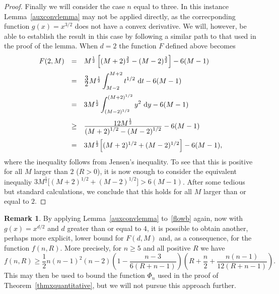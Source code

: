 \documentclass[11pt,a4paper,times]{amsart}
\theoremstyle{plain}
\theoremstyle{definition}
\newtheorem{remark}{Remark}[section]
\numberwithin{equation}{section}
\newcommand{\ds}{\displaystyle}
\newcommand{\dint}{\ds\int}
\newcommand{\eqskip}{ \vspace*{2mm}\\ }
\newcommand{\fr}[2]{\frac{\ds #1}{\ds #2}}
\begin{document}
{\begin{proof}
 Finally we will consider the case $n$ equal to three. In this instance Lemma~\ref{auxconvlemma} may not be applied directly,
 as the correcponding function $g(x) = x^{3/2}$ does not have a convex derivative. We will, however, be able to establish the
 result in this case by following a similar path to that used in the proof of the lemma. When $d=2$ the function $F$ defined above
 becomes
 \[
 \begin{array}{lll}
  F(2,M) & = & M^{\frac{1}{2}}\left[ (M+2)^{\frac{3}{2}} - (M-2)^{\frac{3}{2}} \right] -6(M-1)\eqskip
  & = & \fr{3}{2} M^{\frac{1}{2}} \dint_{M-2}^{M+2} t^{1/2} \ {\rm d}t - 6(M-1)\eqskip
  & = & 3M^{\frac{1}{2}} \dint_{(M-2)^{1/2}}^{(M+2)^{1/2}} y^2 \ {\rm d}y - 6(M-1) \eqskip
  & \geq & \fr{12 M^{\frac{1}{2}}}{(M+2)^{1/2}-(M-2)^{1/2}}- 6(M-1)\eqskip
  & = & 3M^{\frac{1}{2}} \Big[(M+2)^{1/2}+(M-2)^{1/2}\Big]- 6(M-1),
 \end{array}
 \]
 where the inequality follows from Jensen's inequality. To see that this is positive for all $M$ larger than $2$ ($R>0$),
 it is now enough to consider the equivalent inequaliy $3M^{\frac{1}{2}} \Big[(M+2)^{1/2}+(M-2)^{1/2}\Big] > 6(M-1)$.
 After some tedious but standard calculations, we conclude that this holds for all $M$ larger than or equal to $2$.
\end{proof}
\begin{remark}
 By applying Lemma~\ref{auxconvlemma} to~\eqref{flowb} again, now with $g(x) = x^{d/2}$ and $d$ greater than or equal to $4$,
 it is possible to obtain another, perhaps more explicit, lower bound for $F(d,M)$ and, as a consequence, for the function $f(n,R)$.
 More precisely, for $n\geq5$ and all positive $R$ we have
 \[
  f(n,R) \geq \fr{1}{2}n(n-1)^2(n-2) \left(1-\fr{n-3}{6(R+n-1)} \right) \left( R+\fr{n}{2} +\fr{n(n-1)}{12(R+n-1)}\right).
 \]
 This may then be used to bound the function $\Phi_n$ used in the proof of Theorem~\ref{thmxquantitative}, but we will not pursue
 this approach further.
\end{remark}



}
\end{document}
